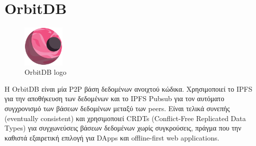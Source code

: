 \section{OrbitDB}

\begin{figure}[H]
	\centering
	\includegraphics[width=2cm]{assets/figures/orbitdb-logo.png}
	\caption{OrbitDB logo}
\end{figure}

Η OrbitDB είναι μία P2P βάση δεδομένων ανοιχτού κώδικα. Χρησιμοποιεί το IPFS για την αποθήκευση των δεδομένων και το IPFS Pubsub για τον αυτόματο συγχρονισμό των βάσεων δεδομένων μεταξύ των peers. Είναι τελικά συνεπής (eventually consistent) και χρησιμοποιεί CRDTs (Conflict-Free Replicated Data Types) για συγχωνεύσεις βάσεων δεδομένων χωρίς συγκρούσεις, πράγμα που την καθιστά εξαιρετική επιλογή για DApps και offline-first web applications.\cite{2.8-orbitdb}

